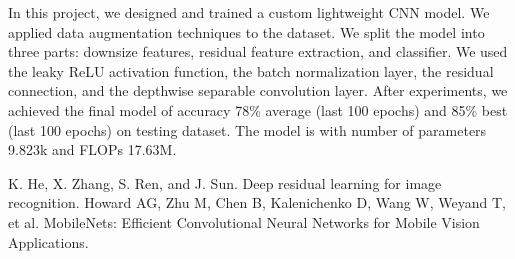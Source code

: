 \documentclass[12pt]{article}
\begin{document}
In this project, we designed and trained a custom lightweight CNN model. We applied data augmentation techniques to the dataset. We split the model into three parts: downsize features, residual feature extraction, and classifier. We used the leaky ReLU activation function, the batch normalization layer, the residual connection, and the depthwise separable convolution layer. After experiments, we achieved the final model of accuracy 78\% average (last 100 epochs) and 85\% best (last 100 epochs) on testing dataset. The model is with number of parameters 9.823k and FLOPs 17.63M.

\begin{thebibliography}{9}
K. He, X. Zhang, S. Ren, and J. Sun. Deep residual learning for image recognition. 
Howard AG, Zhu M, Chen B, Kalenichenko D, Wang W, Weyand T, et al. MobileNets: Efficient Convolutional Neural Networks for Mobile Vision Applications. 
\end{thebibliography}
\end{document}
